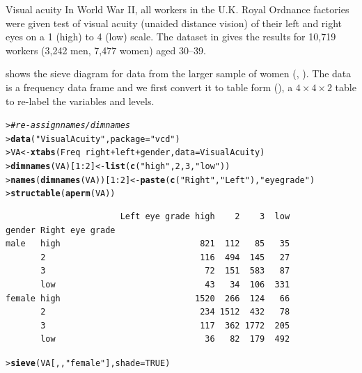 \documentclass[10pt,krantz2]{krantz}\usepackage[]{graphicx}\usepackage[]{color}
\makeatletter
\newcommand{\hlnum}[1]{\textcolor[rgb]{0.686,0.059,0.569}{#1}}%
\newcommand{\hlstr}[1]{\textcolor[rgb]{0.192,0.494,0.8}{#1}}%
\newcommand{\hlcom}[1]{\textcolor[rgb]{0.678,0.584,0.686}{\textit{#1}}}%
\newcommand{\hlopt}[1]{\textcolor[rgb]{0,0,0}{#1}}%
\newcommand{\hlstd}[1]{\textcolor[rgb]{0.345,0.345,0.345}{#1}}%
\newcommand{\hlkwb}[1]{\textcolor[rgb]{0.69,0.353,0.396}{#1}}%
\newcommand{\hlkwc}[1]{\textcolor[rgb]{0.333,0.667,0.333}{#1}}%
\newcommand{\hlkwd}[1]{\textcolor[rgb]{0.737,0.353,0.396}{\textbf{#1}}}%
\newenvironment{kframe}{%
 \def\at@end@of@kframe{}%
 \ifinner\ifhmode%
  \def\at@end@of@kframe{\end{minipage}}%
  \begin{minipage}{\columnwidth}%
 \fi\fi%
 \def\FrameCommand##1{\hskip\@totalleftmargin \hskip-\fboxsep
 \colorbox{shadecolor}{##1}\hskip-\fboxsep
     \hskip-\linewidth \hskip-\@totalleftmargin \hskip\columnwidth}%
 \MakeFramed {\advance\hsize-\width
   \@totalleftmargin\z@ \linewidth\hsize
   \@setminipage}}%
 {\par\unskip\endMakeFramed%
 \at@end@of@kframe}
\newenvironment{knitrout}{}{} %
\renewenvironment{knitrout}{\small\renewcommand{\baselinestretch}{.85}}{} %
\makeatother
\begin{document}
\begin{Example}[vision1]{Visual acuity}
In World War II, all workers in the U.K. Royal Ordnance factories
were given test of visual acuity (unaided distance vision)
of their left and right eyes
on a 1 (high) to 4 (low) scale.  The dataset 
in  gives the results for 10,719 workers
(3,242 men, 7,477 women) aged 30--39.

 shows the sieve diagram for data
from the larger sample of women
(\citet[Table 33.5]{KendallStuart:61},
\citet[p. 284]{Bishop-etal:75}).
The  data is a frequency data frame
and we first convert it to table form (),
a $4 \times 4 \times 2$
table to re-label the variables and levels.
\begin{knitrout}
\color{fgcolor}\begin{kframe}
\begin{alltt}
\hlstd{> }\hlcom{# re-assign names/dimnames}
\hlstd{> }\hlkwd{data}\hlstd{(}\hlstr{"VisualAcuity"}\hlstd{,} \hlkwc{package} \hlstd{=} \hlstr{"vcd"}\hlstd{)}
\hlstd{> }\hlstd{VA} \hlkwb{<-} \hlkwd{xtabs}\hlstd{(Freq} \hlopt{~} \hlstd{right} \hlopt{+} \hlstd{left} \hlopt{+} \hlstd{gender,} \hlkwc{data} \hlstd{= VisualAcuity)}
\hlstd{> }\hlkwd{dimnames}\hlstd{(VA)[}\hlnum{1}\hlopt{:}\hlnum{2}\hlstd{]} \hlkwb{<-} \hlkwd{list}\hlstd{(}\hlkwd{c}\hlstd{(}\hlstr{"high"}\hlstd{,} \hlnum{2}\hlstd{,} \hlnum{3}\hlstd{,} \hlstr{"low"}\hlstd{))}
\hlstd{> }\hlkwd{names}\hlstd{(}\hlkwd{dimnames}\hlstd{(VA))[}\hlnum{1}\hlopt{:}\hlnum{2}\hlstd{]} \hlkwb{<-} \hlkwd{paste}\hlstd{(}\hlkwd{c}\hlstd{(}\hlstr{"Right"}\hlstd{,} \hlstr{"Left"}\hlstd{),} \hlstr{"eye grade"}\hlstd{)}
\hlstd{> }\hlkwd{structable}\hlstd{(}\hlkwd{aperm}\hlstd{(VA))}
\end{alltt}
\begin{verbatim}
                       Left eye grade high    2    3  low
gender Right eye grade                                   
male   high                            821  112   85   35
       2                               116  494  145   27
       3                                72  151  583   87
       low                              43   34  106  331
female high                           1520  266  124   66
       2                               234 1512  432   78
       3                               117  362 1772  205
       low                              36   82  179  492
\end{verbatim}
\end{kframe}
\end{knitrout}
\begin{knitrout}
\color{fgcolor}\begin{kframe}
\begin{alltt}
\hlstd{> }\hlkwd{sieve}\hlstd{(VA[, ,} \hlstr{"female"}\hlstd{],} \hlkwc{shade} \hlstd{=} \hlnum{TRUE}\hlstd{)}
\end{alltt}
\end{kframe}\begin{figure}[!htbp]


\end{figure}
\end{knitrout}
\end{Example}
\end{document}
